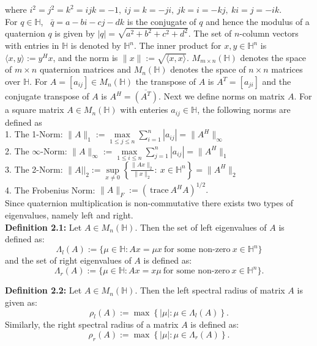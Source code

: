 \documentclass [12pt]{article}
\begin{document}
	\noindent where $i^2=j^2=k^2=ijk=-1,~ij=k=-ji,~jk=i=-kj,~ki=j=-ik.$\\
For $q \in\mathbb{H}$,~ ${\bar{q}}=a-bi-cj-dk$ is the conjugate of $q$ and hence the modulus of a quaternion $q$ is given by $|q|=\sqrt{a^{2}+b^{2}+c^{2}+d^{2}}.$ The set of \(n\)-column vectors with entries in \(\mathbb{H}\) is denoted by \(\mathbb{H}^n\). The inner product for \(x, y \in \mathbb{H}^n\) is \(\langle x, y \rangle := y^H x\), and the norm is \(\|x\| := \sqrt{\langle x, x \rangle}\).
  ${M}_{m\times n}{(\mathbb{H})}$ denotes the space of ${m\times n}$ quaternion matrices and ${M}_{n}{(\mathbb{H})}$ denotes the space of ${n\times n}$ matrices over $\mathbb{H}.$ For $A=[a_{ij}] \in{M}_{n}{(\mathbb{H})}$ the transpose of $A$ is  \(A^T=[a_{ji}]\) and the conjugate transpose of $A$ is \(A^H=\overline{(A^T)}\).  Next we define norms on matrix $A.$
  For a square matrix $A\in M_{n}(\mathbb{H})$
  with enteries $a_{ij}\in\mathbb{H}$, the following norms are defined as \\ 
 1. The 1-Norm: $\|A\|_{1}:=\max\limits_{1\le j \le n}\sum\limits_{i=1}^{n}|a_{ij}|=\|A^{H}\|_{\infty}$\\   
 2. The $\infty$-Norm: $\|A\|_{\infty}:=\max\limits_{1\le i \le n}\sum\limits_{j=1}^{n}|a_{ij}|=\|A^{H}\|_{1}$\\
 3. The 2-Norm: $\|A||_{2}:=\sup\limits_{x\neq 0}\left\{ \frac{\|Ax\|_{2}}{\|x\|_{2}}:~x\in\mathbb{H}^{n}                         \right\} =\|A^{H}\|_{2}$\\
 4. The Frobenius Norm: $\|A\|_{F}:={(~\mbox{trace}~   A^{H}A)}^{1/2}.$\\ 
 
Since quaternion multiplication is non-commutative there exists two types of eigenvalues, namely left and right.\\

 \noindent\textbf{Definition 2.1:} Let $A\in M_{n}{(\mathbb{H})}$. Then the set of left eigenvalues of $A$ is defined as:\\
 $$\Lambda_{l}(A):=\{ \mu \in\mathbb{H} : Ax=\mu x ~\mbox{for some non-zero} ~x\in\mathbb{H}^{n} \}$$
 and the set of right eigenvalues of $A$ is defined as:
$$\Lambda_{r}(A):=\{ \mu \in\mathbb{H} : Ax=x \mu  ~\mbox{for some non-zero} ~x\in\mathbb{H}^{n} \}.$$


\noindent\textbf{Definition 2.2:} Let $A\in M_{n}{(\mathbb{H})}$. Then the left spectral radius of matrix $A$ is given as:\\  
$$ \rho_{l}(A) := \max \left\{|\mu|: \mu\in\Lambda_{l}(A)\right\}.$$
Similarly, the right spectral radius of a matrix $A$ is defined as:\\
$$ \rho_{r}(A) := \max \left\{|\mu|: \mu\in\Lambda_{r}(A)\right\}.$$
\end{document}
